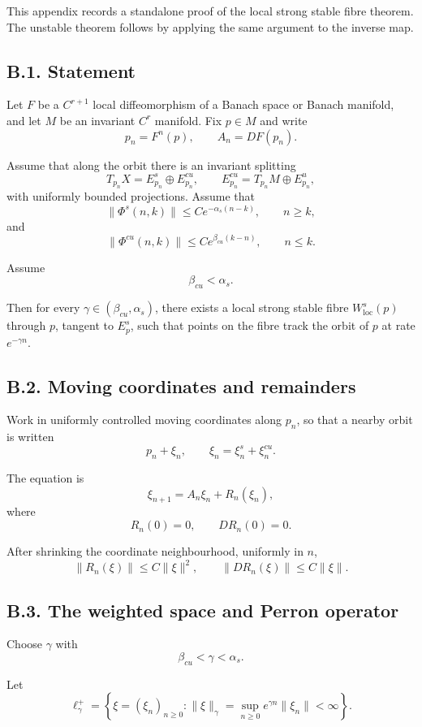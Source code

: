 \documentclass[12pt,a4paper]{article}
\theoremstyle{plain}
\numberwithin{equation}{section}
\numberwithin{theorem}{section}
\begin{document}
This appendix records a standalone proof of the local strong stable fibre theorem. The unstable theorem follows by applying the same argument to the inverse map.

\subsection{B.1. Statement}

Let $F$ be a $C^{r+1}$ local diffeomorphism of a Banach space or Banach manifold, and let $M$ be an invariant $C^r$ manifold. Fix $p\in M$ and write
\[
p_n=F^n(p),
\qquad A_n=DF(p_n).
\]

Assume that along the orbit there is an invariant splitting
\[
T_{p_n}X=E^s_{p_n}\oplus E^{cu}_{p_n},
\qquad
E^{cu}_{p_n}=T_{p_n}M\oplus E^u_{p_n},
\]
with uniformly bounded projections. Assume that
\[
\|\Phi^s(n,k)\|\le C e^{-\alpha_s(n-k)},
\qquad n\ge k,
\]
and
\[
\|\Phi^{cu}(n,k)\|\le C e^{\beta_{cu}(k-n)},
\qquad n\le k.
\]

Assume
\[
\beta_{cu}<\alpha_s.
\]

Then for every $\gamma\in(\beta_{cu},\alpha_s)$, there exists a local strong stable fibre $W^s_{\mathrm{loc}}(p)$ through $p$, tangent to $E^s_p$, such that points on the fibre track the orbit of $p$ at rate $e^{-\gamma n}$.

\subsection{B.2. Moving coordinates and remainders}

Work in uniformly controlled moving coordinates along $p_n$, so that a nearby orbit is written
\[
p_n+\xi_n,
\qquad
\xi_n=\xi_n^s+
\xi_n^{cu}.
\]

The equation is
\[
\xi_{n+1}=A_n\xi_n+R_n(\xi_n),
\]
where
\[
R_n(0)=0,
\qquad DR_n(0)=0.
\]

After shrinking the coordinate neighbourhood, uniformly in $n$,
\[
\|R_n(\xi)\|\le C\|\xi\|^2,
\qquad
\|DR_n(\xi)\|\le C\|\xi\|.
\]

\subsection{B.3. The weighted space and Perron operator}

Choose $\gamma$ with
\[
\beta_{cu}<\gamma<\alpha_s.
\]

Let
\[
\ell_\gamma^+=
\left\{
\xi=(\xi_n)_{n\ge0}:
\|\xi\|_\gamma=
\sup_{n\ge0}e^{\gamma n}\|\xi_n\|<\infty
\right\}.
\]
\end{document}
